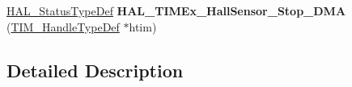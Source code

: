 \begin{DoxyCompactItemize}
\item 
\hyperlink{stm32f4xx__hal__def_8h_a63c0679d1cb8b8c684fbb0632743478f}{H\+A\+L\+\_\+\+Status\+Type\+Def} {\bfseries H\+A\+L\+\_\+\+T\+I\+M\+Ex\+\_\+\+Hall\+Sensor\+\_\+\+Stop\+\_\+\+D\+MA} (\hyperlink{struct_t_i_m___handle_type_def}{T\+I\+M\+\_\+\+Handle\+Type\+Def} $\ast$htim)\hypertarget{group___t_i_m_ex___exported___functions___group1_gab361d1aa6e0eb244886b93908beded6f}{}\label{group___t_i_m_ex___exported___functions___group1_gab361d1aa6e0eb244886b93908beded6f}

\end{DoxyCompactItemize}


\subsection{Detailed Description}
